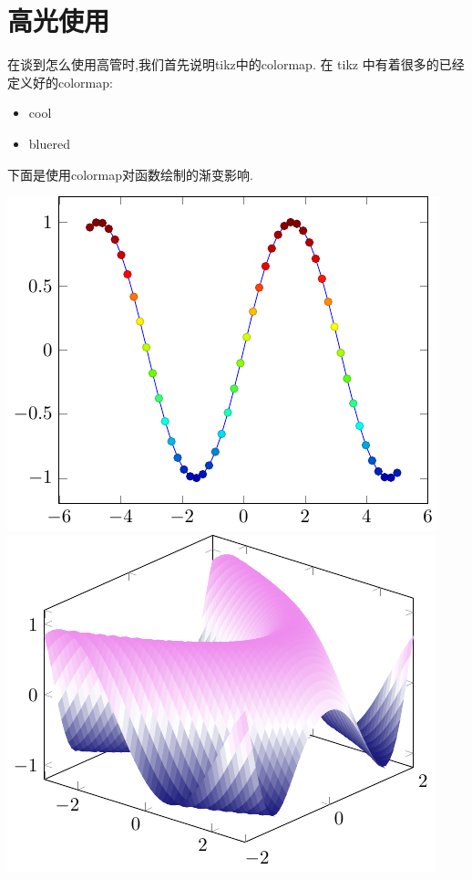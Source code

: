 \documentclass[12pt]{article}
\begin{document}
\section{高光使用}
在谈到怎么使用高管时,我们首先说明tikz中的{\ttfamily colormap}.
在 tikz 中有着很多的已经定义好的{\ttfamily colormap}:
\begin{itemize}
    \item cool
    \item bluered
\end{itemize}


下面是使用colormap对函数绘制的渐变影响.
\begin{center}
    \centering
    \includegraphics[scale=1]{./pics/fig1-1.pdf}
    \includegraphics[scale=1]{./pics/fig1-2.pdf}
\end{center}
\end{document}
